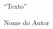 
\vspace*{4cm}
\hspace{.4\textwidth}

\begin{flushright}%

``Texto''

Nome do Autor

\end{flushright}
